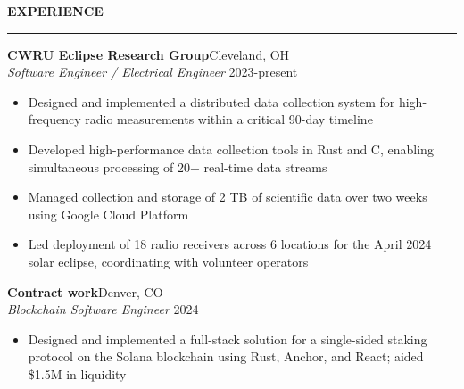 \documentclass[notitlepage,10pt,a4paper]{article}
\newenvironment{resumesection}[1]{
    \header{#1}
}{}
\newcommand{\header}[1]{
    \vspace{2pt}
    \textcolor{accent1}{\Large \textbf{#1}}
    \vspace{6pt}\hrule\vspace{4pt}
}
\newcommand{\TECH}{
    \textcolor{accent3}{\small\textbf{SKILLS}}\small\,
}
\newcommand{\thingsep}{
    \vspace{4pt}
}
\begin{document}
\begin{resumesection}{EXPERIENCE}

    \textcolor{accent2}{\textbf{\large{CWRU Eclipse Research Group}}}\hfill\normalsize Cleveland, OH\\
    \textit{Software Engineer / Electrical Engineer} \hfill {\small 2023-present}
    {\small\begin{itemize}[noitemsep, font=\small, label={-}, leftmargin=*, topsep=0pt, partopsep=0pt]
        \item Designed and implemented a distributed data collection system for high-frequency radio measurements within a critical 90-day timeline
        \item Developed high-performance data collection tools in Rust and C, enabling simultaneous processing of 20+ real-time data streams
        \item Managed collection and storage of 2 TB of scientific data over two weeks using Google Cloud Platform
        \item Led deployment of 18 radio receivers across 6 locations for the April 2024 solar eclipse, coordinating with volunteer operators
    \end{itemize}}
    \thingsep

    \textcolor{accent2}{\textbf{\large{Contract work}}}\hfill\normalsize Denver, CO \\
    \textit{Blockchain Software Engineer} \hfill {\small 2024}
    {\small\begin{itemize}[noitemsep, font=\small, label={-}, leftmargin=*, topsep=0pt, partopsep=0pt]
        \item Designed and implemented a full-stack solution for a single-sided staking protocol on the Solana blockchain using Rust, Anchor, and React; aided \$1.5M in liquidity
    \end{itemize}}
    \thingsep




\end{resumesection}
\end{document}
